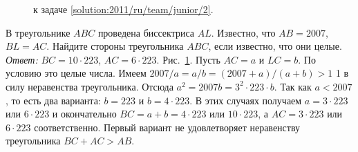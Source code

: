 \ifsolution
\begin{figure}\centering
    \caption{к задаче \ref{solution:2011/ru/team/junior/2}.}
    \label{fig:solution:2011/ru/team/junior/2}
\end{figure}
\fi %

\problem{}
В треугольнике $ABC$ проведена биссектриса $AL$.
Известно, что $AB = 2007$, $BL = AC$.
Найдите стороны треугольника $ABC$, если известно, что они целые.
\solution
\label{solution:2011/ru/team/junior/2}%
\emph{Ответ:} $BC = 10 \cdot 223$, $AC = 6 \cdot 223$.
Рис.~\ref{fig:solution:2011/ru/team/junior/2}.
Пусть $AC = a$ и $LC = b$.
По условию это целые числа.
Имеем $2007 / a = a / b = (2007 + a) / (a + b) > 1$ 1 в силу неравенства
треугольника.
Отсюда $a^2 = 2007 b = 3^2 \cdot 223 \cdot b$.
Так как  $a < 2007$, то есть два варианта:
$b = 223$ и $b = 4 \cdot 223$.
В этих случаях получаем $a = 3 \cdot 223$ или $6 \cdot 223$ и окончательно
$BC = a + b = 4 \cdot 223$ или $10 \cdot 223$, а $AC = 3 \cdot 223$ или
$6 \cdot 223$ соответственно.
Первый вариант не удовлетворяет неравенству треугольника $BC + AC > AB$.
\endproblem
